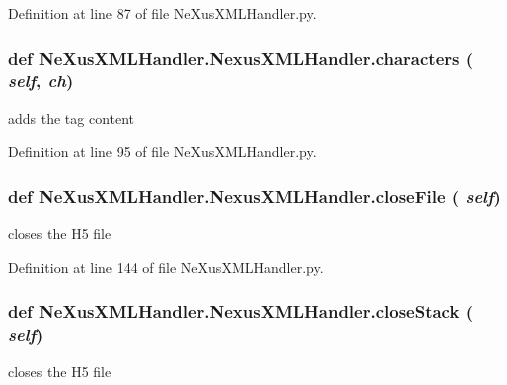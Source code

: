 Definition at line 87 of file NeXusXMLHandler.py.\hypertarget{classNeXusXMLHandler_1_1NexusXMLHandler_a511fcde10a9b9d8c2e15ee7db985afd0}{
\subsubsection[{characters}]{\setlength{\rightskip}{0pt plus 5cm}def NeXusXMLHandler.NexusXMLHandler.characters ( {\em self}, \/   {\em ch})}}
\label{classNeXusXMLHandler_1_1NexusXMLHandler_a511fcde10a9b9d8c2e15ee7db985afd0}
\begin{DoxyVerb}adds the tag content \end{DoxyVerb}
 

Definition at line 95 of file NeXusXMLHandler.py.\hypertarget{classNeXusXMLHandler_1_1NexusXMLHandler_a2ace80a98195619c99f25b1fde5f0bdc}{
\subsubsection[{closeFile}]{\setlength{\rightskip}{0pt plus 5cm}def NeXusXMLHandler.NexusXMLHandler.closeFile ( {\em self})}}
\label{classNeXusXMLHandler_1_1NexusXMLHandler_a2ace80a98195619c99f25b1fde5f0bdc}
\begin{DoxyVerb}closes the H5 file \end{DoxyVerb}
 

Definition at line 144 of file NeXusXMLHandler.py.\hypertarget{classNeXusXMLHandler_1_1NexusXMLHandler_af18a74c3a7cd434a8c36030b9f57aafe}{
\subsubsection[{closeStack}]{\setlength{\rightskip}{0pt plus 5cm}def NeXusXMLHandler.NexusXMLHandler.closeStack ( {\em self})}}
\label{classNeXusXMLHandler_1_1NexusXMLHandler_af18a74c3a7cd434a8c36030b9f57aafe}
\begin{DoxyVerb}closes the H5 file \end{DoxyVerb}
 

